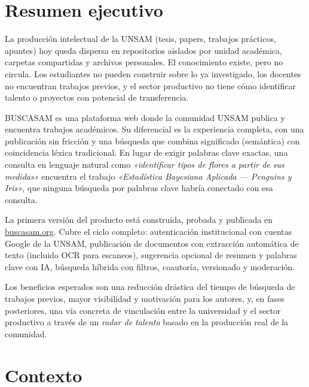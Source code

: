 \documentclass[12pt,a4paper]{article}
\begin{document}
\section{Resumen ejecutivo}

La producción intelectual de la UNSAM (tesis, papers, trabajos prácticos, apuntes) hoy queda dispersa en repositorios aislados por unidad académica, carpetas compartidas y archivos personales. El conocimiento existe, pero no circula. Los estudiantes no pueden construir sobre lo ya investigado, los docentes no encuentran trabajos previos, y el sector productivo no tiene cómo identificar talento o proyectos con potencial de transferencia.

BUSCASAM es una plataforma web donde la comunidad UNSAM publica y encuentra trabajos académicos. Su diferencial es la experiencia completa, con una publicación sin fricción y una búsqueda que combina significado (semántica) con coincidencia léxica tradicional. En lugar de exigir palabras clave exactas, una consulta en lenguaje natural como \emph{«identificar tipos de flores a partir de sus medidas»} encuentra el trabajo \emph{«Estadística Bayesiana Aplicada — Penguins y Iris»}, que ninguna búsqueda por palabras clave habría conectado con esa consulta.

La primera versión del producto está construida, probada y publicada en \href{https://buscasam.org}{buscasam.org}. Cubre el ciclo completo: autenticación institucional con cuentas Google de la UNSAM, publicación de documentos con extracción automática de texto (incluido OCR para escaneos), sugerencia opcional de resumen y palabras clave con IA, búsqueda híbrida con filtros, coautoría, versionado y moderación.

Los beneficios esperados son una reducción drástica del tiempo de búsqueda de trabajos previos, mayor visibilidad y motivación para los autores, y, en fases posteriores, una vía concreta de vinculación entre la universidad y el sector productivo a través de un \emph{radar de talento} basado en la producción real de la comunidad.

\section{Contexto}
\end{document}

